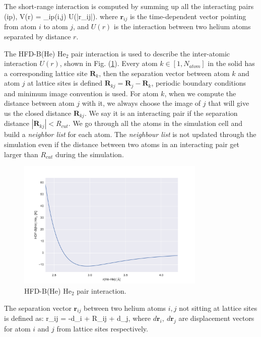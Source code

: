 \documentclass[11pt,letter,nocenter]{revtex4-1}
\begin{document}
The short-range interaction is computed by summing up all the interacting pairs (ip),  
\be V(\bm r) = \sum_{ip(i,j)} U(|\bm r_{ij}|). \ee
where $\bm r_{ij}$ is the time-dependent vector pointing from atom $i$ to atom $j$, and $U(r)$ is the interaction between two helium atoms separated by distance $r$. 

 The HFD-B(He) He$_2$ pair interaction \cite{Aziz1987} is used to describe the inter-atomic interaction $U(r)$, shown in Fig. (\ref{fig:pot}). 
 Every atom $k \in [1,N_{atom} ] $ in the solid has a corresponding lattice site $\bm R_k$, then the separation vector between atom $k$ and atom $j$ at lattice sites is defined $\bm R_{kj} = \bm R_j - \bm R_k $, periodic  
boundary conditions and minimum image convention is used. For atom $k$, when we compute the distance between atom $j$ with it, we always choose the image of $j$ that will give us the closed distance $\bm R_{kj}$. We say it is an interacting pair if the separation distance $| \bm R_{kj} | < R_{cut} $. We go through all the atoms in the simulation cell and build a \textit{neighbor list} for each atom. The \textit{neighbour list} is not updated through the simulation even if the distance between two atoms in an interacting pair get larger than $R_{cut}$ during the simulation.   

\begin{figure}
\includegraphics[width=0.8\textwidth]{figs/pot.pdf}
\caption{HFD-B(He) He$_2$ pair interaction.}
\label{fig:pot}
\end{figure}


The separation vector $\bm{r}_{ij}$ between two helium atoms $i,j$ not sitting at lattice sites is defined as:
\be \bm r_{ij} = -d_i + \bm R_{ij} + d_j, \ee
where $d\bm{r}_i,~d\bm{r}_j$ are displacement vectors for atom $i$ and $j$ from lattice sites respectively.
 
\end{document}
